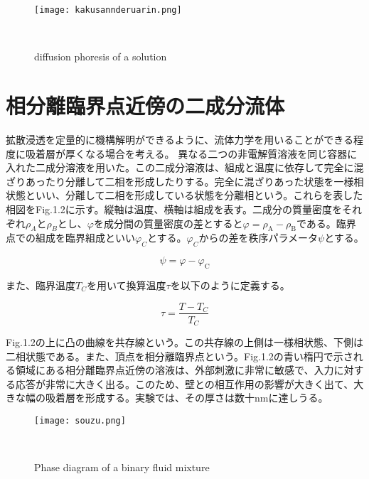 \documentclass[a4paper,12pt, oneside, openany]{jsbook}
\begin{document}
\begin{figure}[!htbp]
\label{Fig.1}
\texttt{[image: kakusannderuarin.png]}
\vspace*{-0.4cm}
\centering  %
\begin{spacing}{0.8}　%
\caption{diffusion phoresis of a solution}
\end{spacing}
\end{figure}

\section{相分離臨界点近傍の二成分流体}
拡散浸透を定量的に機構解明ができるように、流体力学を用いることができる程度に吸着層が厚くなる場合を考える。
異なる二つの非電解質溶液を同じ容器に入れた二成分溶液を用いた。この二成分溶液は、組成と温度に依存して完全に混ざりあったり分離して二相を形成したりする。完全に混ざりあった状態を一様相状態といい、分離して二相を形成している状態を分離相という。これらを表した相図をFig.1.2に示す。縦軸は温度、横軸は組成を表す。二成分の質量密度をそれぞれ$\rho_A$と$\rho_B$とし、$\varphi$を成分間の質量密度の差とすると$\varphi=\rho_\mathrm{A}-\rho_\mathrm{B}$である。臨界点での組成を臨界組成といい$\varphi_C$とする。$\varphi_C$からの差を秩序パラメータ$\psi$とする。

\begin{equation}\label{1}
\psi=\varphi-\varphi_\mathrm{C}
\end{equation}

\noindent また、臨界温度$T_C$を用いて換算温度$\tau$を以下のように定義する。

\begin{equation}\label{2}
\tau=\frac{T-T_C}{T_C}
\end{equation}


\noindent Fig.1.2の上に凸の曲線を共存線という。この共存線の上側は一様相状態、下側は二相状態である。また、頂点を相分離臨界点という。Fig.1.2の青い楕円で示される領域にある相分離臨界点近傍の溶液は、外部刺激に非常に敏感で、入力に対する応答が非常に大きく出る。このため、壁との相互作用の影響が大きく出て、大きな幅の吸着層を形成する。実験では、その厚さは数十nmに達しうる。
\begin{figure}[!htbp]
\label{Fig.3}
\texttt{[image: souzu.png]}
\vspace*{-0.4cm}
\centering  %
\begin{spacing}{0.8}　%
\caption{Phase diagram of a binary fluid mixture}
\end{spacing}
\end{figure}
\end{document}
